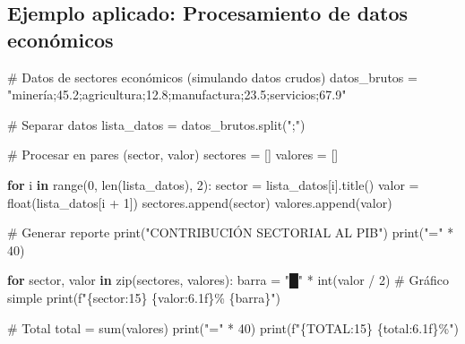 \documentclass[
  doc,
  floatsintext,
  longtable,
  a4paper,
  nolmodern,
  notxfonts,
  notimes,
  12pt,
  colorlinks=true,linkcolor=blue,citecolor=blue,urlcolor=blue]{apa7}
\newenvironment{Shaded}{\begin{snugshade}}{\end{snugshade}}
\newcommand{\BuiltInTok}[1]{\textcolor[rgb]{0.00,0.23,0.31}{#1}}
\newcommand{\CommentTok}[1]{\textcolor[rgb]{0.37,0.37,0.37}{#1}}
\newcommand{\ControlFlowTok}[1]{\textcolor[rgb]{0.00,0.23,0.31}{\textbf{#1}}}
\newcommand{\DecValTok}[1]{\textcolor[rgb]{0.68,0.00,0.00}{#1}}
\newcommand{\KeywordTok}[1]{\textcolor[rgb]{0.00,0.23,0.31}{\textbf{#1}}}
\newcommand{\NormalTok}[1]{\textcolor[rgb]{0.00,0.23,0.31}{#1}}
\newcommand{\OperatorTok}[1]{\textcolor[rgb]{0.37,0.37,0.37}{#1}}
\newcommand{\SpecialCharTok}[1]{\textcolor[rgb]{0.37,0.37,0.37}{#1}}
\newcommand{\SpecialStringTok}[1]{\textcolor[rgb]{0.13,0.47,0.30}{#1}}
\newcommand{\StringTok}[1]{\textcolor[rgb]{0.13,0.47,0.30}{#1}}
\begin{document}
\subsection{Ejemplo aplicado: Procesamiento de datos
económicos}\label{ejemplo-aplicado-procesamiento-de-datos-econuxf3micos}

\begin{Shaded}
\begin{Highlighting}[]
\CommentTok{\# Datos de sectores económicos (simulando datos crudos)}
\NormalTok{datos\_brutos }\OperatorTok{=} \StringTok{"minería;45.2;agricultura;12.8;manufactura;23.5;servicios;67.9"}

\CommentTok{\# Separar datos}
\NormalTok{lista\_datos }\OperatorTok{=}\NormalTok{ datos\_brutos.split(}\StringTok{";"}\NormalTok{)}

\CommentTok{\# Procesar en pares (sector, valor)}
\NormalTok{sectores }\OperatorTok{=}\NormalTok{ []}
\NormalTok{valores }\OperatorTok{=}\NormalTok{ []}

\ControlFlowTok{for}\NormalTok{ i }\KeywordTok{in} \BuiltInTok{range}\NormalTok{(}\DecValTok{0}\NormalTok{, }\BuiltInTok{len}\NormalTok{(lista\_datos), }\DecValTok{2}\NormalTok{):}
\NormalTok{    sector }\OperatorTok{=}\NormalTok{ lista\_datos[i].title()}
\NormalTok{    valor }\OperatorTok{=} \BuiltInTok{float}\NormalTok{(lista\_datos[i }\OperatorTok{+} \DecValTok{1}\NormalTok{])}
\NormalTok{    sectores.append(sector)}
\NormalTok{    valores.append(valor)}

\CommentTok{\# Generar reporte}
\BuiltInTok{print}\NormalTok{(}\StringTok{"CONTRIBUCIÓN SECTORIAL AL PIB"}\NormalTok{)}
\BuiltInTok{print}\NormalTok{(}\StringTok{"="} \OperatorTok{*} \DecValTok{40}\NormalTok{)}

\ControlFlowTok{for}\NormalTok{ sector, valor }\KeywordTok{in} \BuiltInTok{zip}\NormalTok{(sectores, valores):}
\NormalTok{    barra }\OperatorTok{=} \StringTok{"█"} \OperatorTok{*} \BuiltInTok{int}\NormalTok{(valor }\OperatorTok{/} \DecValTok{2}\NormalTok{)  }\CommentTok{\# Gráfico simple}
    \BuiltInTok{print}\NormalTok{(}\SpecialStringTok{f"}\SpecialCharTok{\{}\NormalTok{sector}\SpecialCharTok{:15\}}\SpecialStringTok{ }\SpecialCharTok{\{}\NormalTok{valor}\SpecialCharTok{:6.1f\}}\SpecialStringTok{\% }\SpecialCharTok{\{}\NormalTok{barra}\SpecialCharTok{\}}\SpecialStringTok{"}\NormalTok{)}

\CommentTok{\# Total}
\NormalTok{total }\OperatorTok{=} \BuiltInTok{sum}\NormalTok{(valores)}
\BuiltInTok{print}\NormalTok{(}\StringTok{"="} \OperatorTok{*} \DecValTok{40}\NormalTok{)}
\BuiltInTok{print}\NormalTok{(}\SpecialStringTok{f"}\SpecialCharTok{\{}\StringTok{\textquotesingle{}TOTAL\textquotesingle{}}\SpecialCharTok{:15\}}\SpecialStringTok{ }\SpecialCharTok{\{}\NormalTok{total}\SpecialCharTok{:6.1f\}}\SpecialStringTok{\%"}\NormalTok{)}
\end{Highlighting}
\end{Shaded}
\end{document}
